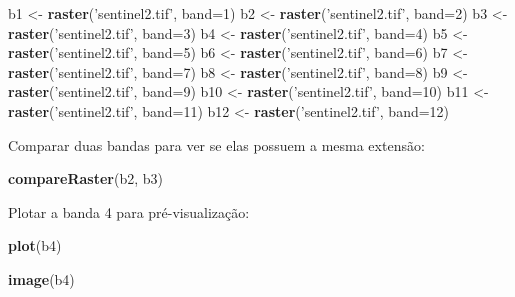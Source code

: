 \documentclass[
]{book}
\newenvironment{Shaded}{\begin{snugshade}}{\end{snugshade}}
\newcommand{\DataTypeTok}[1]{\textcolor[rgb]{0.13,0.29,0.53}{#1}}
\newcommand{\DecValTok}[1]{\textcolor[rgb]{0.00,0.00,0.81}{#1}}
\newcommand{\KeywordTok}[1]{\textcolor[rgb]{0.13,0.29,0.53}{\textbf{#1}}}
\newcommand{\NormalTok}[1]{#1}
\newcommand{\StringTok}[1]{\textcolor[rgb]{0.31,0.60,0.02}{#1}}
\begin{document}
\begin{Shaded}
\begin{Highlighting}[]
\NormalTok{b1 <-}\StringTok{ }\KeywordTok{raster}\NormalTok{(}\StringTok{'sentinel2.tif'}\NormalTok{, }\DataTypeTok{band=}\DecValTok{1}\NormalTok{)}
\NormalTok{b2 <-}\StringTok{ }\KeywordTok{raster}\NormalTok{(}\StringTok{'sentinel2.tif'}\NormalTok{, }\DataTypeTok{band=}\DecValTok{2}\NormalTok{)}
\NormalTok{b3 <-}\StringTok{ }\KeywordTok{raster}\NormalTok{(}\StringTok{'sentinel2.tif'}\NormalTok{, }\DataTypeTok{band=}\DecValTok{3}\NormalTok{)}
\NormalTok{b4 <-}\StringTok{ }\KeywordTok{raster}\NormalTok{(}\StringTok{'sentinel2.tif'}\NormalTok{, }\DataTypeTok{band=}\DecValTok{4}\NormalTok{)}
\NormalTok{b5 <-}\StringTok{ }\KeywordTok{raster}\NormalTok{(}\StringTok{'sentinel2.tif'}\NormalTok{, }\DataTypeTok{band=}\DecValTok{5}\NormalTok{)}
\NormalTok{b6 <-}\StringTok{ }\KeywordTok{raster}\NormalTok{(}\StringTok{'sentinel2.tif'}\NormalTok{, }\DataTypeTok{band=}\DecValTok{6}\NormalTok{)}
\NormalTok{b7 <-}\StringTok{ }\KeywordTok{raster}\NormalTok{(}\StringTok{'sentinel2.tif'}\NormalTok{, }\DataTypeTok{band=}\DecValTok{7}\NormalTok{)}
\NormalTok{b8 <-}\StringTok{ }\KeywordTok{raster}\NormalTok{(}\StringTok{'sentinel2.tif'}\NormalTok{, }\DataTypeTok{band=}\DecValTok{8}\NormalTok{)}
\NormalTok{b9 <-}\StringTok{ }\KeywordTok{raster}\NormalTok{(}\StringTok{'sentinel2.tif'}\NormalTok{, }\DataTypeTok{band=}\DecValTok{9}\NormalTok{)}
\NormalTok{b10 <-}\StringTok{ }\KeywordTok{raster}\NormalTok{(}\StringTok{'sentinel2.tif'}\NormalTok{, }\DataTypeTok{band=}\DecValTok{10}\NormalTok{)}
\NormalTok{b11 <-}\StringTok{ }\KeywordTok{raster}\NormalTok{(}\StringTok{'sentinel2.tif'}\NormalTok{, }\DataTypeTok{band=}\DecValTok{11}\NormalTok{)}
\NormalTok{b12 <-}\StringTok{ }\KeywordTok{raster}\NormalTok{(}\StringTok{'sentinel2.tif'}\NormalTok{, }\DataTypeTok{band=}\DecValTok{12}\NormalTok{)}
\end{Highlighting}
\end{Shaded}

Comparar duas bandas para ver se elas possuem a mesma extensão:

\begin{Shaded}
\begin{Highlighting}[]
\KeywordTok{compareRaster}\NormalTok{(b2, b3)}
\end{Highlighting}
\end{Shaded}

Plotar a banda 4 para pré-visualização:

\begin{Shaded}
\begin{Highlighting}[]
\KeywordTok{plot}\NormalTok{(b4)}

\KeywordTok{image}\NormalTok{(b4)}
\end{Highlighting}
\end{Shaded}
\end{document}

